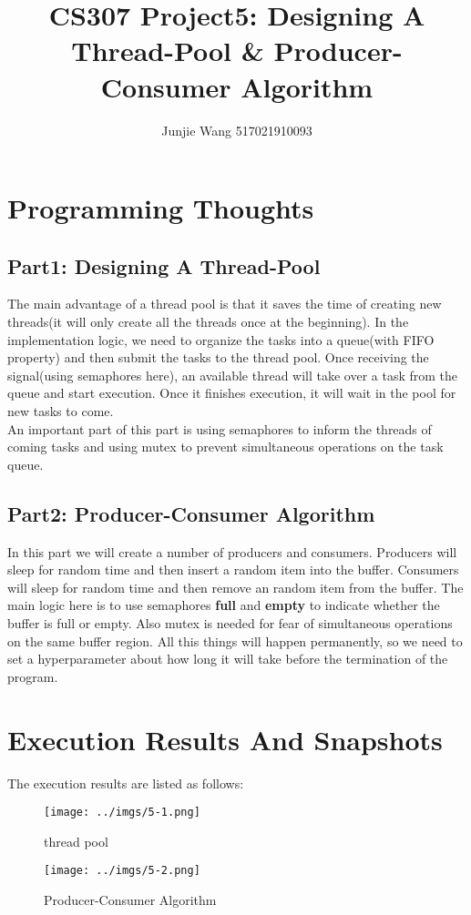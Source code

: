 \documentclass[12pt]{extarticle}
\title{CS307 Project5: Designing A Thread-Pool \& Producer-Consumer Algorithm}
\author{Junjie Wang 517021910093}
\newcommand{\<}{\langle}
\renewcommand{\>}{\rangle}
\theoremstyle{definition}
\begin{document}
	\maketitle
	\section{Programming Thoughts}
	\subsection{Part1: Designing A Thread-Pool}
	The main advantage of a thread pool is that it saves the time of creating new threads(it will only create all the threads once at the beginning). In the implementation logic, we need to organize the tasks into a queue(with FIFO property) and then submit the tasks to the thread pool. Once receiving the signal(using semaphores here), an available thread will take over a task from the queue and start execution. Once it finishes execution, it will wait in the pool for new tasks to come. \\
	An important part of this part is using semaphores to inform the threads of coming tasks and using mutex to prevent simultaneous operations on the task queue.
	\subsection{Part2: Producer-Consumer Algorithm}
	In this part we will create a number of producers and consumers. Producers will sleep for random time and then insert a random item into the buffer. Consumers will sleep for random time and then remove an random item from the buffer. The main logic here is to use semaphores \textbf{full} and \textbf{empty} to indicate whether the buffer is full or empty. Also mutex is needed for fear of simultaneous operations on the same buffer region. All this things will happen permanently, so we need to set a hyperparameter about how long it will take before the termination of the program.
	\section{Execution Results And Snapshots}
	The execution results are listed as follows:
	\begin{figure}[H]
	\centering 
	\texttt{[image: ../imgs/5-1.png]}
	\caption{thread pool}
	\end{figure}
	\begin{figure}[H]
		\centering 
		\texttt{[image: ../imgs/5-2.png]}
		\caption{Producer-Consumer Algorithm}
	\end{figure}
\end{document}
